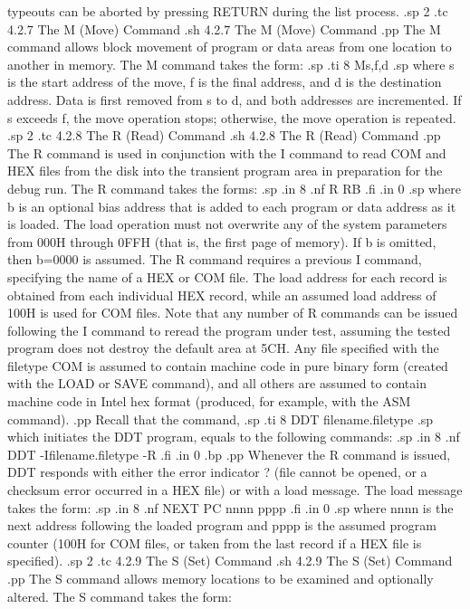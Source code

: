 typeouts can be aborted by pressing RETURN during the list 
process.
.sp 2
.tc         4.2.7  The M (Move) Command
.sh
4.2.7  The M (Move) Command
.pp
The M command allows block movement of program or data areas from 
one location to another in memory.  The M command takes the form:
.sp
.ti 8
Ms,f,d
.sp
where s is the start address of the move, f is the final address, 
and d is the destination address.  Data is first removed from s 
to d, and both addresses are incremented.  If s exceeds f, the 
move operation stops; otherwise, the move operation is repeated.
.sp 2
.tc         4.2.8  The R (Read) Command
.sh
4.2.8  The R (Read) Command
.pp
The R command is used in conjunction with the I command to read 
COM and HEX files from the disk into the transient program 
area in preparation for the debug run.  The R command takes the forms:
.sp
.in 8
.nf
R
RB
.fi
.in 0
.sp
where b is an optional bias address that is added to each program 
or data address as it is loaded.  The load operation must not 
overwrite any of the system parameters from 000H through 0FFH
(that is, the first page of memory).  If b is omitted, then 
b=0000 is assumed.  The R command requires a previous I command, 
specifying the name of a HEX or COM file.  The load address for 
each record is obtained from each individual HEX record, while an 
assumed load address of 100H is used for COM files.  Note that 
any number of R commands can be issued following the I command to 
reread the program under test, assuming the tested program does 
not destroy the default area at 5CH.  Any file specified with the 
filetype COM is assumed to contain machine code in pure binary 
form (created with the LOAD or SAVE command), and all others are 
assumed to contain machine code in Intel hex format (produced, 
for example, with the ASM command).
.pp
Recall that the command,
.sp
.ti 8
DDT filename.filetype
.sp
which initiates the DDT program, equals to the following commands:
.sp
.in 8
.nf
DDT
-Ifilename.filetype
-R
.fi
.in 0
.bp
.pp
Whenever the R command is issued, DDT responds with either the 
error indicator ? (file cannot be opened, or a checksum error 
occurred in a HEX file) or with a load message.  The load message
takes the form:
.sp
.in 8
.nf
NEXT PC
nnnn pppp
.fi
.in 0
.sp
where nnnn is the next address following the loaded program and 
pppp is the assumed program counter (100H for COM files, or 
taken from the last record if a HEX file is specified).
.sp 2
.tc         4.2.9  The S (Set) Command
.sh
4.2.9  The S (Set) Command
.pp
The S command allows memory locations to be examined and 
optionally altered.  The S command takes the form:
